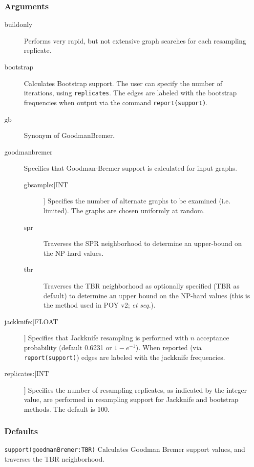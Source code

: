 	\subsubsection{Arguments}
		\begin{description}
		\item[buildonly] Performs very rapid, but not extensive graph searches for each 
		resampling replicate.
		
		\item[bootstrap] Calculates Bootstrap support. The user can specify the number of 
		iterations, using \texttt{replicates}. The edges are labeled with the bootstrap 
		frequencies when output via the command \texttt{report(support)}.
		
		\item[gb] Synonym of GoodmanBremer.
			
		\item[goodmanbremer] Specifies that Goodman-Bremer support is 
		calculated for input graphs. 
			
			\begin{description}
			\item[gbsample:[INT]] Specifies the number of alternate graphs to be examined (i.e. limited). 
			The graphs are chosen uniformly at random.
			
			\item[spr] Traverses the SPR neighborhood to determine an upper-bound on 
			the NP-hard values.
			
			\item[tbr] Traverses the TBR neighborhood 
			as optionally specified (TBR as default) to determine an upper bound on the NP-hard 
			values (this is the method used in POY v2; \citealp{POY2} \textit{et seq.}).
			\end{description}
		
		\item[jackknife:[FLOAT]] Specifies that Jackknife resampling is performed with $n$ acceptance 
		probability (default 0.6231 or $1 - e^{-1}$). When reported (via \texttt{report(support)}) 
		edges are labeled with the jackknife frequencies.
		
		\item[replicates:[INT]] Specifies the number of resampling replicates, as indicated by the 
		integer value, are performed in resampling support for Jackknife and bootstrap methods. 
		The default is 100.
		\end{description}	
		
	\subsubsection{Defaults}
		\texttt{support(goodmanBremer:TBR)} Calculates Goodman Bremer support values, 
		and traverses the TBR neighborhood.
		

